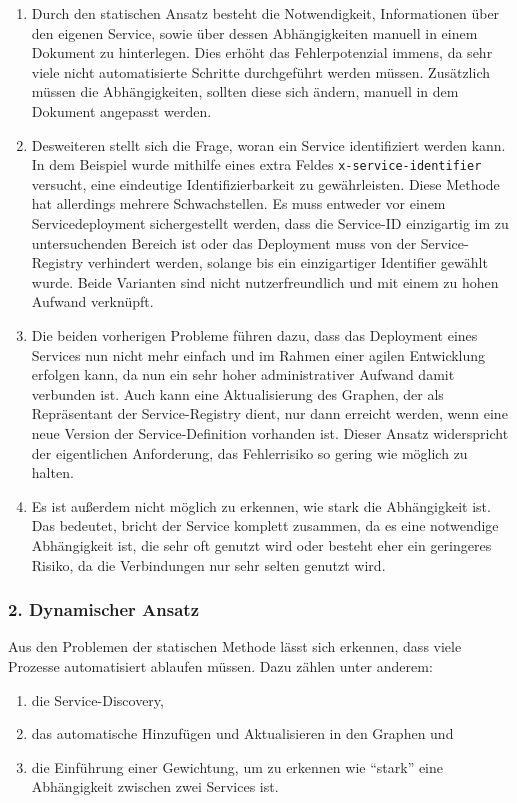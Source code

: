 \documentclass[
	12pt,
	BCOR=5mm,
	DIV=12,
	headinclude=on,
	footinclude=off,
	parskip=half,
	bibliography=totoc,
	listof=entryprefix,
	toc=listof,
	numbers=noenddot,
	plainfootsepline
]{scrreprt}
\begin{document}
\begin{enumerate}
	\item Durch den statischen Ansatz besteht die Notwendigkeit, Informationen über den eigenen Service, sowie über dessen Abhängigkeiten manuell in einem Dokument zu hinterlegen. Dies erhöht das Fehlerpotenzial immens, da sehr viele nicht automatisierte Schritte durchgeführt werden müssen. Zusätzlich müssen die Abhängigkeiten, sollten diese sich ändern, manuell in dem Dokument angepasst werden.
	\item Desweiteren stellt sich die Frage, woran ein Service identifiziert werden kann. In dem Beispiel wurde mithilfe eines extra Feldes \texttt{x-service-identifier} versucht, eine eindeutige Identifizierbarkeit zu gewährleisten. Diese Methode hat allerdings mehrere Schwachstellen. Es muss entweder vor einem Servicedeployment sichergestellt werden, dass die Service-ID einzigartig im zu untersuchenden Bereich ist oder das Deployment muss von der Service-Registry verhindert werden, solange bis ein einzigartiger Identifier gewählt wurde. Beide Varianten sind nicht nutzerfreundlich und mit einem zu hohen Aufwand verknüpft.
	\item Die beiden vorherigen Probleme führen dazu, dass das Deployment eines Services nun nicht mehr einfach und im Rahmen einer agilen Entwicklung erfolgen kann, da nun ein sehr hoher administrativer Aufwand damit verbunden ist. Auch kann eine Aktualisierung des Graphen, der als Repräsentant der Service-Registry dient, nur dann erreicht werden, wenn eine neue Version der Service-Definition vorhanden ist. Dieser Ansatz widerspricht der eigentlichen Anforderung, das Fehlerrisiko so gering wie möglich zu halten.
	\item Es ist außerdem nicht möglich zu erkennen, wie stark die Abhängigkeit ist. Das bedeutet, bricht der Service komplett zusammen, da es eine notwendige Abhängigkeit ist, die sehr oft genutzt wird oder besteht eher ein geringeres Risiko, da die Verbindungen nur sehr selten genutzt wird.
\end{enumerate}

\subsubsection*{2. Dynamischer Ansatz}

Aus den Problemen der statischen Methode lässt sich erkennen, dass viele Prozesse automatisiert ablaufen müssen. Dazu zählen unter anderem:

\begin{enumerate}
	\item die Service-Discovery,
	\item das automatische Hinzufügen und Aktualisieren in den Graphen und
	\item die Einführung einer Gewichtung, um zu erkennen wie \enquote{stark} eine Abhängigkeit zwischen zwei Services ist.
\end{enumerate}
\end{document}
